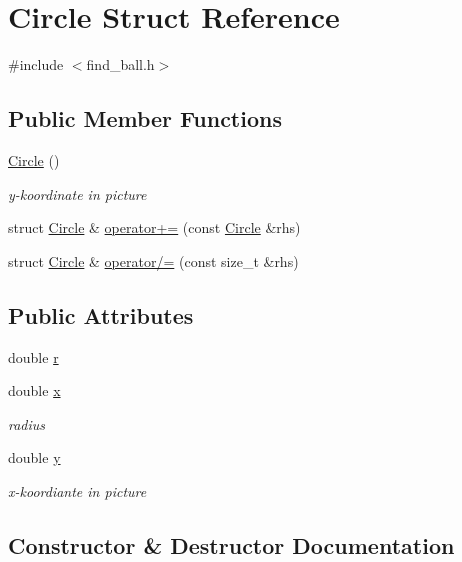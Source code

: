 \hypertarget{struct_circle}{}\section{Circle Struct Reference}
\label{struct_circle}


{\ttfamily \#include $<$find\+\_\+ball.\+h$>$}

\subsection*{Public Member Functions}
\begin{DoxyCompactItemize}
\item 
\hyperlink{struct_circle_ad1ecfcfc7bf34529c6a6d6c448bf70fe}{Circle} ()
\begin{DoxyCompactList}\small\item\em y-\/koordinate in picture \end{DoxyCompactList}\item 
struct \hyperlink{struct_circle}{Circle} \& \hyperlink{struct_circle_a1230c28b9acd17b71fd5b196ddb5b9c9}{operator+=} (const \hyperlink{struct_circle}{Circle} \&rhs)
\item 
struct \hyperlink{struct_circle}{Circle} \& \hyperlink{struct_circle_ae8305acf7bfbd5fcf09769144f9b22ff}{operator/=} (const size\+\_\+t \&rhs)
\end{DoxyCompactItemize}
\subsection*{Public Attributes}
\begin{DoxyCompactItemize}
\item 
double \hyperlink{struct_circle_a1e492090654899b1b52902b875a431b6}{r}
\item 
double \hyperlink{struct_circle_afb78bb3d13fde2c40e5d4ac1626b0e5b}{x}
\begin{DoxyCompactList}\small\item\em radius \end{DoxyCompactList}\item 
double \hyperlink{struct_circle_ac2027738070be7ef3c86f100307c3501}{y}
\begin{DoxyCompactList}\small\item\em x-\/koordiante in picture \end{DoxyCompactList}\end{DoxyCompactItemize}


\subsection{Constructor \& Destructor Documentation}
\hypertarget{struct_circle_ad1ecfcfc7bf34529c6a6d6c448bf70fe}{}
